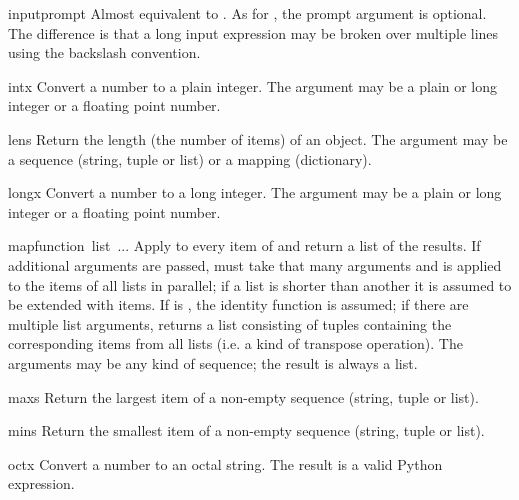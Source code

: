 \begin{funcdesc}{input}{prompt}
  Almost equivalent to .  As for
  , the prompt argument is optional.  The difference is
  that a long input expression may be broken over multiple lines using the
  backslash convention.
\end{funcdesc}

\begin{funcdesc}{int}{x}
  Convert a number to a plain integer.  The argument may be a plain or
  long integer or a floating point number.
\end{funcdesc}

\begin{funcdesc}{len}{s}
  Return the length (the number of items) of an object.  The argument
  may be a sequence (string, tuple or list) or a mapping (dictionary).
\end{funcdesc}

\begin{funcdesc}{long}{x}
  Convert a number to a long integer.  The argument may be a plain or
  long integer or a floating point number.
\end{funcdesc}

\begin{funcdesc}{map}{function\, list\, ...}
Apply  to every item of  and return a list
of the results.  If additional  arguments are passed, 
 must take that many arguments and is applied to
the items of all lists in parallel; if a list is shorter than another
it is assumed to be extended with  items.  If
 is , the identity function is assumed; if
there are multiple list arguments,  returns a list
consisting of tuples containing the corresponding items from all lists
(i.e. a kind of transpose operation).  The  arguments may be
any kind of sequence; the result is always a list.
\end{funcdesc}

\begin{funcdesc}{max}{s}
  Return the largest item of a non-empty sequence (string, tuple or
  list).
\end{funcdesc}

\begin{funcdesc}{min}{s}
  Return the smallest item of a non-empty sequence (string, tuple or
  list).
\end{funcdesc}

\begin{funcdesc}{oct}{x}
  Convert a number to an octal string.  The result is a valid Python
  expression.
\end{funcdesc}

